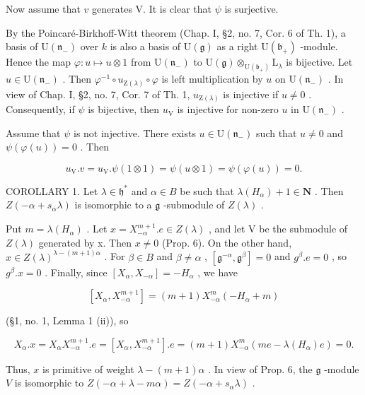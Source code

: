 Now assume that \(v\) generates V. It is clear that \(\psi\) is surjective.

By the Poincaré-Birkhoff-Witt theorem (Chap. I, §2, no. 7, Cor. 6 of Th. 1), a basis of \(\mathrm{U}(\mathfrak{n}_{-})\) over \(k\) is also a basis of \(\mathrm{U}(\mathfrak{g})\) as a right \(\mathrm{U}(\mathfrak{b}_{+})\) -module. Hence the map \(\varphi : u \mapsto u \otimes 1\) from \(\mathrm{U}(\mathfrak{n}_{-})\) to \(\mathrm{U}(\mathfrak{g}) \otimes_{\mathrm{U}(\mathfrak{b}_{+})} \mathrm{L}_{\lambda}\) is bijective. Let \(u \in \mathrm{U}(\mathfrak{n}_{-})\) . Then \(\varphi^{-1} \circ u_{\mathrm{Z}(\lambda)} \circ \varphi\) is left multiplication by \(u\) on \(\mathrm{U}(\mathfrak{n}_{-})\) . In view of Chap. I, §2, no. 7, Cor. 7 of Th. 1, \(u_{\mathrm{Z}(\lambda)}\) is injective if \(u \neq 0\) . Consequently, if \(\psi\) is bijective, then \(u_{\mathrm{V}}\) is injective for non-zero \(u\) in \(\mathrm{U}(\mathfrak{n}_{-})\) .

Assume that \(\psi\) is not injective. There exists \(u \in \mathrm{U}(\mathfrak{n}_{-})\) such that \(u \neq 0\) and \(\psi(\varphi(u)) = 0\) . Then

\[
u _ {\mathrm{V}}. v = u _ {\mathrm{V}}. \psi (1 \otimes 1) = \psi (u \otimes 1) = \psi (\varphi (u)) = 0.
\]

COROLLARY 1. Let \(\lambda \in \mathfrak{h}^*\) and \(\alpha \in B\) be such that \(\lambda(H_{\alpha}) + 1 \in \mathbf{N}\) . Then \(Z(-\alpha + s_{\alpha}\lambda)\) is isomorphic to a \(\mathfrak{g}\) -submodule of \(Z(\lambda)\) .

Put \(m = \lambda(H_{\alpha})\) . Let \(x = X_{-\alpha}^{m+1}.e \in Z(\lambda)\) , and let V be the submodule of \(Z(\lambda)\) generated by x. Then \(x \neq 0\) (Prop. 6). On the other hand, \(x \in Z(\lambda)^{\lambda-(m+1)\alpha}\) . For \(\beta \in B\) and \(\beta \neq \alpha\) , \([\mathfrak{g}^{-\alpha}, \mathfrak{g}^{\beta}] = 0\) and \(g^{\beta}.e = 0\) , so \(g^{\beta}.x = 0\) . Finally, since \([X_{\alpha}, X_{-\alpha}] = -H_{\alpha}\) , we have

\[
[ X _ {\alpha}, X _ {- \alpha} ^ {m + 1} ] = (m + 1) X _ {- \alpha} ^ {m} (- H _ {\alpha} + m)
\]

(§1, no. 1, Lemma 1 (ii)), so

\[
X _ {\alpha}. x = X _ {\alpha} X _ {- \alpha} ^ {m + 1}. e = [ X _ {\alpha}, X _ {- \alpha} ^ {m + 1} ]. e = (m + 1) X _ {- \alpha} ^ {m} (m e - \lambda (H _ {\alpha}) e) = 0.
\]

Thus, \(x\) is primitive of weight \(\lambda - (m + 1)\alpha\) . In view of Prop. 6, the \(\mathfrak{g}\) -module \(V\) is isomorphic to \(Z(-\alpha + \lambda - m\alpha) = Z(-\alpha + s_{\alpha}\lambda)\) .

